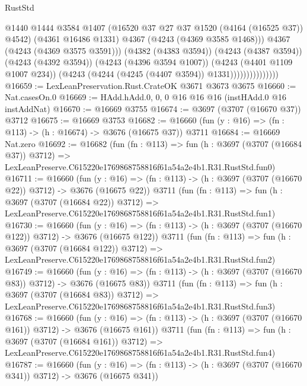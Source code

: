 \begin{lexlean}{RustStd}
\begin{coremodule}
                                  @1440
                                  @1444
                                  @3584
                                  @1407
                                  (@16520 @37 @27 @37 @1520 (@4164 (@16525 @37)) @4542)
                                  (@4361 @16486 @1331)
                                  @4367
                                  (@4243 (@4369 @3585 @1468)))
                                @4367
                                (@4243 (@4369 @3575 @3591)))
                              (@4382 (@4383 @3594))
                              (@4243 (@4387 @3594))
                              (@4243 (@4392 @3594))
                              (@4243 (@4396 @3594 @1007))
                              (@4243 (@4401 @1109 @1007 @234))
                              (@4243 (@4244 (@4245 (@4407 @3594)) @1331)))))))))))))))
@16659 := LexLeanPreservation.Rust.CrateOK @3671 @3673 @3675
@16660 := Nat.casesOn.{0}
@16669 := HAdd.hAdd.{0, 0, 0} @16 @16 @16 (instHAdd.{0} @16 instAddNat)
@16670 := @16669 @3755
@16674 := @3697 (@3707 (@16670 @37)) @3712
@16675 := @16669 @3753
@16682 := @16660 (fun (y : @16) => (fn : @113) -> (h : @16674) -> @3676 (@16675 @37)) @3711
@16684 := @16669 Nat.zero
@16692 := @16682
    (fun (fn : @113) =>
    fun (h : @3697 (@3707 (@16684 @37)) @3712) =>
    LexLeanPreserve.C615220e1769868758816f61a54a2e4b1.R31.RustStd.fun0)
@16711 := @16660
    (fun (y : @16) => (fn : @113) -> (h : @3697 (@3707 (@16670 @22)) @3712) -> @3676 (@16675 @22))
    @3711
    (fun (fn : @113) =>
    fun (h : @3697 (@3707 (@16684 @22)) @3712) =>
    LexLeanPreserve.C615220e1769868758816f61a54a2e4b1.R31.RustStd.fun1)
@16730 := @16660
    (fun (y : @16) => (fn : @113) -> (h : @3697 (@3707 (@16670 @122)) @3712) -> @3676 (@16675 @122))
    @3711
    (fun (fn : @113) =>
    fun (h : @3697 (@3707 (@16684 @122)) @3712) =>
    LexLeanPreserve.C615220e1769868758816f61a54a2e4b1.R31.RustStd.fun2)
@16749 := @16660
    (fun (y : @16) => (fn : @113) -> (h : @3697 (@3707 (@16670 @83)) @3712) -> @3676 (@16675 @83))
    @3711
    (fun (fn : @113) =>
    fun (h : @3697 (@3707 (@16684 @83)) @3712) =>
    LexLeanPreserve.C615220e1769868758816f61a54a2e4b1.R31.RustStd.fun3)
@16768 := @16660
    (fun (y : @16) => (fn : @113) -> (h : @3697 (@3707 (@16670 @161)) @3712) -> @3676 (@16675 @161))
    @3711
    (fun (fn : @113) =>
    fun (h : @3697 (@3707 (@16684 @161)) @3712) =>
    LexLeanPreserve.C615220e1769868758816f61a54a2e4b1.R31.RustStd.fun4)
@16787 := @16660
    (fun (y : @16) => (fn : @113) -> (h : @3697 (@3707 (@16670 @341)) @3712) -> @3676 (@16675 @341))

\end{coremodule}
\end{lexlean}
